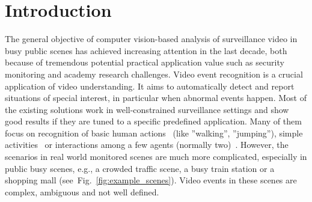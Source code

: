 \chapter{Introduction}
\label{chap:introduction}
\setcounter{page}{1}
The general objective of computer vision-based analysis of surveillance video in busy public scenes has achieved increasing attention in the last decade, both because of tremendous potential practical application value such as security monitoring and academy research challenges.
Video event recognition is a crucial application of video understanding. 
It aims to automatically detect and report situations of special interest, in particular when abnormal events happen.
Most of the existing solutions work in well-constrained surveillance settings and show good results if they are tuned to a specific predefined application. 
Many of them focus on recognition of basic human actions~\cite{zhou2009human, marszalek2009actions} (like ''walking'', ''jumping''), simple activities~\cite{wang2014hierarchical} or interactions among a few agents (normally two)~\cite{sun2013active}.
However, the scenarios in real world monitored scenes are much more complicated, especially in public busy scenes, e.g., a crowded traffic scene, a busy train station or a shopping mall (see~Fig.~\ref{fig:example_scenes}). Video events in these scenes are complex, ambiguous and not well defined. 

